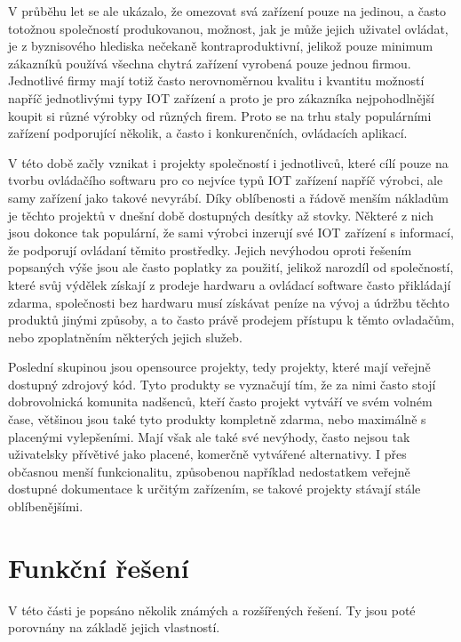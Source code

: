 V průběhu let se ale ukázalo, že omezovat svá zařízení pouze na jedinou, a často totožnou společností produkovanou, možnost, jak je může jejich uživatel ovládat, je z byznisového hlediska nečekaně kontraproduktivní, jelikož pouze minimum zákazníků používá všechna chytrá zařízení vyrobená pouze jednou firmou. Jednotlivé firmy mají totiž často nerovnoměrnou kvalitu i kvantitu možností napříč jednotlivými typy IOT zařízení a proto je pro zákazníka nejpohodlnější koupit si různé výrobky od různých firem. Proto se na trhu staly populárními zařízení podporující několik, a často i konkurenčních, ovládacích aplikací.

V této době začly vznikat i projekty společností i jednotlivců, které cílí pouze na tvorbu ovládačího softwaru pro co nejvíce typů IOT zařízení napříč výrobci, ale samy zařízení jako takové nevyrábí. Díky oblíbenosti a řádově menším nákladům je těchto projektů v dnešní době dostupných desítky až stovky. Některé z nich jsou dokonce tak populární, že sami výrobci inzerují své IOT zařízení s informací, že podporují ovládaní těmito prostředky. Jejich nevýhodou oproti řešením popsaných výše jsou ale často poplatky za použití, jelikož narozdíl od společností, které svůj výdělek získají z prodeje hardwaru a ovládací software často přikládají zdarma, společnosti bez hardwaru musí získávat peníze na vývoj a údržbu těchto produktů jinými způsoby, a to často právě prodejem přístupu k těmto ovladačům, nebo zpoplatněním některých jejich služeb.

Poslední skupinou jsou opensource projekty, tedy projekty, které mají veřejně dostupný zdrojový kód. Tyto produkty se vyznačují tím, že za nimi často stojí dobrovolnická komunita nadšenců, kteří často projekt vytváří ve svém volném čase, většinou jsou také tyto produkty kompletně zdarma, nebo maximálně s placenými vylepšeními. Mají však ale také své nevýhody, často nejsou tak uživatelsky přívětivé jako placené, komerčně vytvářené alternativy. I přes občasnou menší funkcionalitu, způsobenou například nedostatkem veřejně dostupné dokumentace k určitým zařízením, se takové projekty stávají stále oblíbenějšími.

\section{Funkční řešení}

V této části je popsáno několik známých a rozšířených řešení. Ty jsou poté porovnány na základě jejich vlastností.


